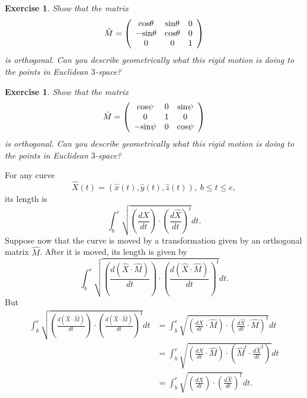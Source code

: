 \documentclass{article}%
\newtheorem{exercise}[theorem]{Exercise}
\begin{document}
\begin{exercise}
\label{14} Show that the matrix%
\[
\hat{M}=\left(
\begin{array}
[c]{ccc}%
\mathrm{cos}\theta & \mathrm{sin}\theta & 0\\
\mathrm{-sin}\theta & \mathrm{cos}\theta & 0\\
0 & 0 & 1
\end{array}
\right)
\]
is orthogonal. Can you describe geometrically what this rigid motion is doing
to the points in Euclidean $3$-space?
\end{exercise}

\begin{exercise}
Show that the matrix%
\[
\hat{M}=\left(
\begin{array}
[c]{ccc}%
\mathrm{cos}\psi & \mathrm{0} & \mathrm{sin}\psi\\
\mathrm{0} & \mathrm{1} & 0\\
\mathrm{-sin}\psi & 0 & \mathrm{cos}\psi
\end{array}
\right)
\]
is orthogonal. Can you describe geometrically what this rigid motion is doing
to the points in Euclidean $3$-space?
\end{exercise}

For any curve%
\[
\hat{X}\left(  t\right)  =\left(  \hat{x}\left(  t\right)  ,\hat{y}\left(
t\right)  ,\hat{z}\left(  t\right)  \right)  ,\;b\leq t\leq e,
\]
its length is%
\[%
{\displaystyle\int\nolimits_{b}^{e}}
\sqrt{\left(  \frac{d\hat{X}}{dt}\right)  \cdot\left(  \frac{d\hat{X}}%
{dt}\right)  ^{t}}dt.
\]
Suppose now that the curve is moved by a transformation given by an orthogonal
matrix $\hat{M}$. After it is moved, its length is given by%
\[%
{\displaystyle\int\nolimits_{b}^{e}}
\sqrt{\left(  \frac{d\left(  \hat{X}\cdot\hat{M}\right)  }{dt}\right)
\cdot\left(  \frac{d\left(  \hat{X}\cdot\hat{M}\right)  }{dt}\right)  ^{t}%
}dt.
\]
But%
\begin{align*}%
{\displaystyle\int\nolimits_{b}^{e}}
\sqrt{\left(  \frac{d\left(  \hat{X}\cdot\hat{M}\right)  }{dt}\right)
\cdot\left(  \frac{d\left(  \hat{X}\cdot\hat{M}\right)  }{dt}\right)  ^{t}}dt
&  =%
{\displaystyle\int\nolimits_{b}^{e}}
\sqrt{\left(  \frac{d\hat{X}}{dt}\cdot\hat{M}\right)  \cdot\left(  \frac
{d\hat{X}}{dt}\cdot\hat{M}\right)  ^{t}}dt\\
&  =%
{\displaystyle\int\nolimits_{b}^{e}}
\sqrt{\left(  \frac{d\hat{X}}{dt}\cdot\hat{M}\right)  \cdot\left(  \hat{M}%
^{t}\cdot\frac{d\hat{X}}{dt}^{t}\right)  }dt\\
&  =%
{\displaystyle\int\nolimits_{b}^{e}}
\sqrt{\left(  \frac{d\hat{X}}{dt}\right)  \cdot\left(  \frac{d\hat{X}}%
{dt}\right)  ^{t}}dt.
\end{align*}
\end{document}
